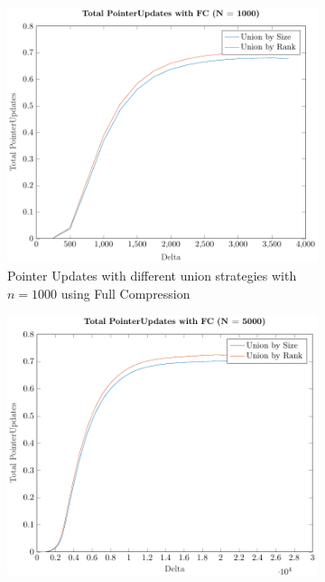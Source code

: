 \begin{figure}[ht]
    \centering
    \begin{subfigure}{0.32\textwidth}
        \centering
        \includegraphics[width=\textwidth]{../images/plotFCNonFull1000_PointerUpdates.pdf}
        \caption{Pointer Updates with different union strategies with $n = 1000$ using Full Compression}
    \end{subfigure}%
    \hfill
    \begin{subfigure}{0.32\textwidth}
        \centering
        \includegraphics[width=\textwidth]{../images/plotFCNonFull5000_PointerUpdates.pdf}

\end{subfigure}
\end{figure}

